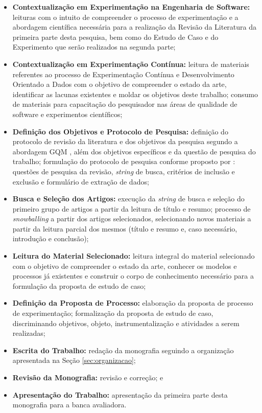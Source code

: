 \begin{itemize}
    \item \textbf{Contextualização em Experimentação na Engenharia de Software:} leituras com o intuito de compreender o processo de experimentação e a abordagem científica necessária para a realização da Revisão da Literatura da primeira parte desta pesquisa, bem como do Estudo de Caso e do Experimento que serão realizados na segunda parte;
    \item \textbf{Contextualização em Experimentação Contínua:} leitura de materiais referentes ao processo de Experimentação Contínua e Desenvolvimento Orientado a Dados com o objetivo de compreender o estado da arte, identificar as lacunas existentes e moldar os objetivos deste trabalho; consumo de materiais para capacitação do pesquisador nas áreas de qualidade de software e experimentos científicos;
    \item \textbf{Definição dos Objetivos e Protocolo de Pesquisa:} definição do protocolo de revisão da literatura e dos objetivos da pesquisa segundo a abordagem GQM \cite{basili_goal_1994}, além dos objetivos específicos e da questão de pesquisa do trabalho; formulação do protocolo de pesquisa conforme proposto por : questões de pesquisa da revisão, \textit{string} de busca, critérios de inclusão e exclusão e formulário de extração de dados;
    \item \textbf{Busca e Seleção dos Artigos:} execução da \textit{string} de busca e seleção do primeiro grupo de artigos a partir da leitura de título e resumo; processo de \textit{snowballing} a partir dos artigos selecionados, selecionando novos materiais a partir da leitura parcial dos mesmos (título e resumo e, caso necessário, introdução e conclusão);
    \item \textbf{Leitura do Material Selecionado:} leitura integral do material selecionado com o objetivo de compreender o estado da arte, conhecer os modelos e processos já existentes e construir o corpo de conhecimento necessário para a formulação da proposta de estudo de caso;
    \item \textbf{Definição da Proposta de Processo:} elaboração da proposta de processo de experimentação; formalização da proposta de estudo de caso, discriminando objetivos, objeto, instrumentalização e atividades a serem realizadas;
    \item \textbf{Escrita do Trabalho:} redação da monografia seguindo a organização apresentada na Seção \ref{sec:organizacao};
    \item \textbf{Revisão da Monografia:} revisão e correção; e
    \item \textbf{Apresentação do Trabalho:} apresentação da primeira parte desta monografia para a banca avaliadora.
\end{itemize}


